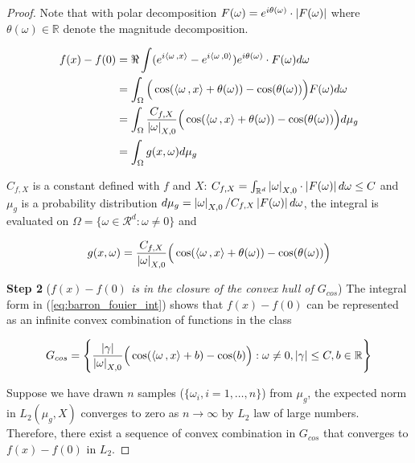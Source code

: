 \begin{proof}
    Note that with polar decomposition $F(\omega) = e^{i\theta(\omega)} \cdot
        \left| F(\omega) \right|$ where $\theta(\omega) \in \mathbb{R}$ denote the magnitude
    decomposition.

    \begin{align}
        f(x) - f(0)
         & = \Re \int (e^{i\left\langle \omega\, , x \right\rangle} - e^{i\left\langle \omega\, , 0 \right\rangle}) e^{i\theta(\omega)} \cdot F(\omega) d\omega                              \\
         & = \int_{\Omega}\Big(\cos(\left\langle \omega\, , x \right\rangle + \theta(\omega)) - \cos(\theta(\omega))\Big)
        F(\omega) d\omega                                                                                                                    \\
         & = \int_{\Omega} \frac{C_{f,X}}{\left| \omega \right|_{X, 0}}\Big(\cos(\left\langle \omega\, , x \right\rangle + \theta(\omega)) - \cos(\theta(\omega))\Big) d\mu_g \\
         & = \int_{\Omega} g(x, \omega) d\mu_g \label{eq:barron_fouier_int}
    \end{align}

    $C_{f,X}$ is a constant defined with $f$ and $X$: $C_{f,X} =
        \int_{\mathbb{R}^d} \left| \omega \right|_{X, 0} \cdot \left| F(\omega) \right| d\omega \leq
        C$ and $\mu_g$ is a probability distribution $d\mu_g =
        \left| \omega \right|_{X,0}/C_{f,X}\left| F(\omega) \right| d\omega$, the integral is
    evaluated on $\Omega = \{\omega \in \mathcal{R}^d: \omega \not = 0\}$ and

    \begin{equation}
        g(x, \omega) = \frac{C_{f,X}}{\left| \omega \right|_{X, 0}}\Big(\cos(\left\langle \omega\, , x \right\rangle + \theta(\omega)) - \cos(\theta(\omega))\Big)
    \end{equation}

    \textbf{Step 2} (\textit{$f(x) - f(0)$ is in the closure of the convex hull
        of $G_{cos}$}) The integral form in (\ref{eq:barron_fouier_int}) shows that
    $f(x) - f(0)$ can be represented as an infinite convex combination of
    functions in the class

    \begin{equation}
        G_{cos} = \Bigg\{\frac{\left| \gamma \right|}{\left| \omega \right|_{X, 0}}\Big(\cos(\left\langle \omega\, , x \right\rangle + b) - \cos(b)\Big): \omega \not= 0, \left| \gamma \right| \leq C, b \in \mathbb{R} \Bigg\}
    \end{equation}

    Suppose we have drawn $n$ samples ($\{\omega_i, i = 1,\dots, n\}$) from
    $\mu_g$, the expected norm in $L_2(\mu_g, X)$ converges to zero as $n \to
        \infty$ by $L_2$ law of large numbers. Therefore, there exist a sequence of
    convex combination in $G_{cos}$ that converges to $f(x) - f(0)$ in $L_2$.



\end{proof}
